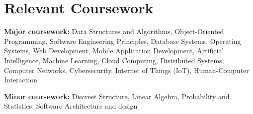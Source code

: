\section{Relevant Coursework}
\vspace{2pt}
\resumeSubHeadingListStart
\small{\item{
                \textbf{Major coursework:}{ Data Structures and Algorithms, Object-Oriented Programming, Software Engineering Principles, Database Systems, Operating Systems, Web Development, Mobile Application Development, Artificial Intelligence, Machine Learning, Cloud Computing, Distributed Systems, Computer Networks, Cybersecurity, Internet of Things (IoT), Human-Computer Interaction} \\ \vspace{3pt}

                \textbf{Minor coursework:}{ Discreet Structure, Linear Algebra, Probability and Statistics, Software Architecture and design}
          }}
\resumeSubHeadingListEnd

